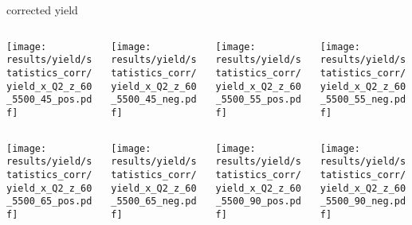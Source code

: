 \begin{frame}{corrected yield}
\begin{columns}
\begin{column}[T]{0.25\textwidth}
\texttt{[image: results/yield/statistics\_corr/yield\_x\_Q2\_z\_60\_5500\_45\_pos.pdf]}
\end{column}
\begin{column}[T]{0.25\textwidth}
\texttt{[image: results/yield/statistics\_corr/yield\_x\_Q2\_z\_60\_5500\_45\_neg.pdf]}
\end{column}
\begin{column}[T]{0.25\textwidth}
\texttt{[image: results/yield/statistics\_corr/yield\_x\_Q2\_z\_60\_5500\_55\_pos.pdf]}
\end{column}
\begin{column}[T]{0.25\textwidth}
\texttt{[image: results/yield/statistics\_corr/yield\_x\_Q2\_z\_60\_5500\_55\_neg.pdf]}
\end{column}
\end{columns}
\begin{columns}
\begin{column}[T]{0.25\textwidth}
\texttt{[image: results/yield/statistics\_corr/yield\_x\_Q2\_z\_60\_5500\_65\_pos.pdf]}
\end{column}
\begin{column}[T]{0.25\textwidth}
\texttt{[image: results/yield/statistics\_corr/yield\_x\_Q2\_z\_60\_5500\_65\_neg.pdf]}
\end{column}
\begin{column}[T]{0.25\textwidth}
\texttt{[image: results/yield/statistics\_corr/yield\_x\_Q2\_z\_60\_5500\_90\_pos.pdf]}
\end{column}
\begin{column}[T]{0.25\textwidth}
\texttt{[image: results/yield/statistics\_corr/yield\_x\_Q2\_z\_60\_5500\_90\_neg.pdf]}
\end{column}
\end{columns}
\end{frame}
